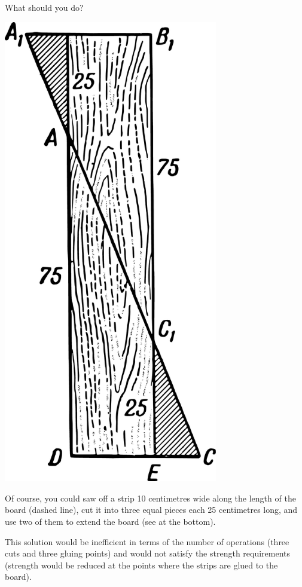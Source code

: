 What should you do?
\begin{marginfigure}%
\centering
\includegraphics[width=0.7\textwidth]{figures/ch-12/fig-190.pdf}
\end{marginfigure}

Of course, you could saw off a strip 10 centimetres wide along the length of the board (dashed line), cut it into three equal pieces each 25 centimetres long, and use two of them to extend the board (see  at the bottom).

This solution would be inefficient in terms of the number of operations (three cuts and three gluing points) and would not satisfy the strength requirements (strength would be reduced at the points where the strips are glued to the board).


